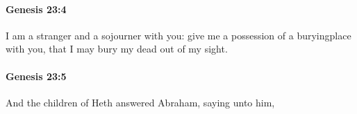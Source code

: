 		\paragraph{Genesis 23:4} %
			\label{GENESIS-23-4}

			I am a stranger and a sojourner with you: give me a possession of a buryingplace with you, that I may bury my dead out of my sight.


		\paragraph{Genesis 23:5} %
			\label{GENESIS-23-5}

			And the children of Heth answered Abraham, saying unto him,


